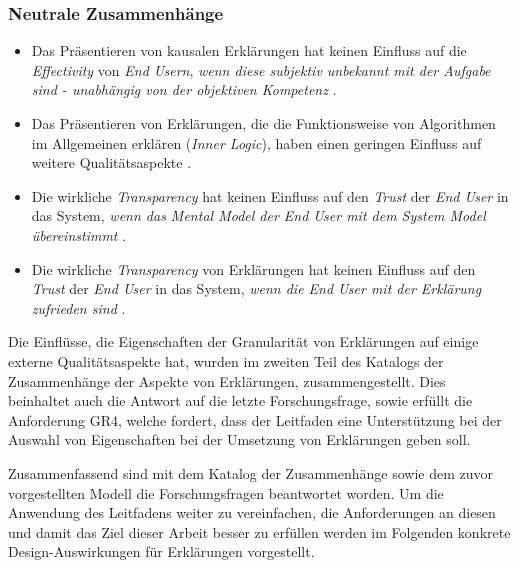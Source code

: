 \subsubsection*{Neutrale Zusammenhänge}

\begin{itemize}
    \item Das Präsentieren von kausalen Erklärungen hat keinen Einfluss auf die \textit{Effectivity} von \textit{End Usern}, \textit{wenn diese subjektiv unbekannt mit der Aufgabe sind - unabhängig von der objektiven Kompetenz} \cite{schaffer_i_2019}.
    \item Das Präsentieren von Erklärungen, die die Funktionsweise von Algorithmen im Allgemeinen erklären (\textit{Inner Logic}), haben einen geringen Einfluss auf weitere Qualitätsaspekte \cite{chazette_end-users_nodate}.
    \item Die wirkliche \textit{Transparency} hat keinen Einfluss auf den \textit{Trust} der \textit{End User} in das System, \textit{wenn das Mental Model der End User mit dem System Model übereinstimmt} \cite{eiband_impact_2019, riveiro_thats_2021}.
    \item Die wirkliche \textit{Transparency} von Erklärungen hat keinen Einfluss auf den \textit{Trust} der \textit{End User} in das System, \textit{wenn die End User mit der Erklärung zufrieden sind} \cite{eiband_impact_2019, riveiro_thats_2021}.
\end{itemize}

\smallskip

\noindent{}

\smallskip

Die Einflüsse, die Eigenschaften der Granularität von Erklärungen auf einige externe Qualitätsaspekte hat, wurden im zweiten Teil des Katalogs der Zusammenhänge der Aspekte von Erklärungen, zusammengestellt. Dies beinhaltet auch die Antwort auf die letzte Forschungsfrage, sowie erfüllt die Anforderung GR4, welche fordert, dass der Leitfaden eine Unterstützung bei der Auswahl von Eigenschaften bei der Umsetzung von Erklärungen geben soll.

\smallskip

Zusammenfassend sind mit dem Katalog der Zusammenhänge sowie dem zuvor vorgestellten Modell die Forschungsfragen beantwortet worden. Um die Anwendung des Leitfadens weiter zu vereinfachen, die Anforderungen an diesen und damit das Ziel dieser Arbeit besser zu erfüllen werden im Folgenden konkrete Design-Auswirkungen für Erklärungen vorgestellt.

